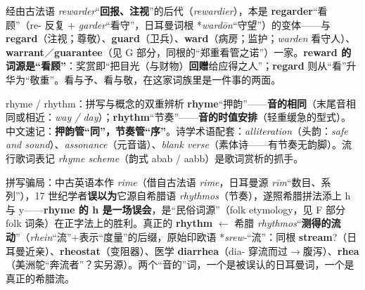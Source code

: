 \documentclass[../main.tex]{subfiles}
\begin{document}
\begin{origin}
经由古法语 \textit{rewarder}“\textbf{回报、注视}”的后代（\textit{rewardier}），本是 \textbf{regarder}“看顾”（re- 反复 + \textit{garder}“看守”，日耳曼词根 *\textit{wardōn}“守望”）的变体——与 \textbf{regard}（注视；尊敬）、\textbf{guard}（卫兵）、\textbf{ward}（病房；监护；\textit{warden} 看守人）、\textbf{warrant}／\textbf{guarantee}（见 G 部分，同根的“郑重看管之诺”）一家。\textbf{reward 的词源是“看顾”}：奖赏即“把目光（与财物）\textbf{回赠}给应得之人”；\textbf{regard} 则从“看”升华为“敬重”。看与予、看与敬，在这家词族里是一件事的两面。
\end{origin}




\begin{gram}{rhyme / rhythm：拼写与概念的双重辨析}
\textbf{rhyme}“押韵”——\textbf{音的相同}（末尾音相同或相近：\textit{way / day}）；\textbf{rhythm}“节奏”——\textbf{音的时值安排}（轻重缓急的型式）。中文速记：\textbf{押韵管“同”，节奏管“序”}。诗学术语配套：\textit{alliteration}（头韵：\textit{safe and sound}）、\textit{assonance}（元音谐）、\textit{blank verse}（素体诗——有节奏无韵脚）。流行歌词表记 \textit{rhyme scheme}（韵式 abab / aabb）是歌词赏析的抓手。
\end{gram}

\begin{origin}
拼写骗局：中古英语本作 \textit{rime}（借自古法语 \textit{rime}，日耳曼源 \textit{rīm}“数目、系列”），17 世纪学者\textbf{误以为}它源自希腊语 \textit{rhythmos}（节奏），遂照希腊拼法添上 h 与 y——\textbf{rhyme 的 h 是一场误会}，是“民俗词源”（folk etymology，见 F 部分 folk 词条）在正字法上的胜利。真正的 \textbf{rhythm} $\leftarrow$ 希腊 \textit{rhythmos}“\textbf{测得的流动}”（\textit{rhein}“流”$+$表示“度量”的后缀，原始印欧语 *\textit{srew-}“流”：同根 \textbf{stream}?（日耳曼近亲）、\textbf{rheostat}（变阻器）、医学 \textbf{diarrhea}（dia- 穿流而过$\to$腹泻）、\textbf{rhea}（美洲鸵“奔流者”？实另源）。两个“音的”词，一个是被误认的日耳曼词，一个是真正的希腊流。
\end{origin}

\end{document}
